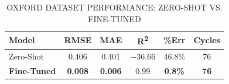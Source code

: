 \begin{table}[H]
	\caption{OXFORD DATASET PERFORMANCE: ZERO-SHOT VS. FINE-TUNED}
	\label{tab:oxford_results}
	\begin{center}
		\footnotesize
		\begin{tabular}{lccccc}
			\hline
			\textbf{Model}      & \textbf{RMSE}  & \textbf{MAE}   & \textbf{R\textsuperscript{2}} & \textbf{\%Err} & \textbf{Cycles} \\
			\hline
			Zero-Shot           & 0.406          & 0.401          & $-36.66$                      & 46.8\%         & 76              \\
			\textbf{Fine-Tuned} & \textbf{0.008} & \textbf{0.006} & $\mathbf{0.99}$               & \textbf{0.8\%} & \textbf{76}     \\
			\hline
		\end{tabular}
	\end{center}
\end{table}

